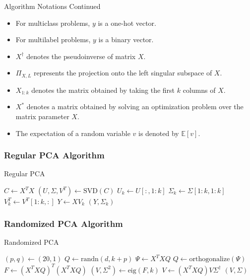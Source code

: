 \documentclass{beamer}
\begin{document}
\begin{frame}{Algorithm Notations Continued}
\begin{itemize}
    \item For multiclass problems, $y$ is a one-hot vector.
    \item For multilabel problems, $y$ is a binary vector.
    \item $X^\dagger$ denotes the pseudoinverse of matrix $X$.
    \item $\Pi_{X,L}$ represents the projection onto the left singular subspace of $X$.
    \item $X_{1:k}$ denotes the matrix obtained by taking the first $k$ columns of $X$.
    \item $X^*$ denotes a matrix obtained by solving an optimization problem over the matrix parameter $X$.
    \item The expectation of a random variable $v$ is denoted by $\mathbb{E}[v]$.
\end{itemize}
\end{frame}

\begin{frame}
\frametitle{Regular PCA Algorithm}
\begin{algorithm}[H]
\caption{Regular PCA}
    \State $C \gets X^TX$ 
    \State $(U, \Sigma, V^T) \gets \text{SVD}(C)$ 
    \State $U_k \gets U[:, 1:k]$ 
    \State $\Sigma_k \gets \Sigma[1:k, 1:k]$ 
    \State $V_k^T \gets V^T[1:k, :]$ 
    \State $Y \gets X V_k$ 
    \State \Return $(Y, \Sigma_k)$
\EndFunction
\end{algorithm}
\end{frame}


\begin{frame}
\frametitle{Randomized PCA Algorithm}
\begin{algorithm}[H]
\caption{Randomized PCA}
    \State $(p, q) \gets (20, 1)$ 
    \State $Q \gets \text{randn}(d, k + p)$
        \State $\Psi \gets X^TXQ$ 
        \State $Q \gets \text{orthogonalize}(\Psi)$
    \EndFor
    \State $F \gets (X^TXQ)^T(X^TXQ)$
    \State $(V, \Sigma^2) \gets \text{eig}(F, k)$
    \State $V \gets (X^TXQ)V\Sigma^\dagger$
    \State \Return $(V, \Sigma)$
\EndFunction
\end{algorithm}
\end{frame}
\end{document}
